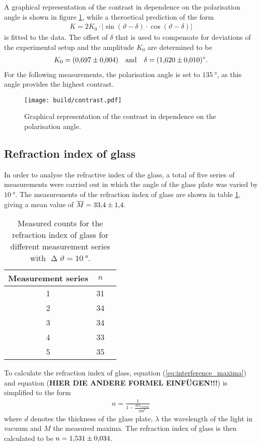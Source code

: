 \noindent
A graphical representation of the contrast in dependence on the polarisation angle is shown in figure \ref{fig:contrast}, while a theroetical prediction of the form
\begin{align}
    K = 2K_0\cdot|\sin(\vartheta-\delta)\cdot\cos(\vartheta-\delta)|
\end{align}
is fitted to the data.
The offset of $\delta$ that is used to compensate for deviations of the experimental setup and the amplitude $K_0$ are determined to be
\begin{align*}
    K_0=\SI{0.697\pm0.004}{} \quad \text{and} \quad \delta=\SI{1.620\pm0.010}{\degree}.
\end{align*}
For the following measurements, the polarisation angle is set to $\SI{135}{\degree}$, as this angle provides the highest contrast.
\begin{figure}[H]
    \centering
    \texttt{[image: build/contrast.pdf]}
    \caption{Graphical representation of the contrast in dependence on the polarisation angle.}
    \label{fig:contrast}
\end{figure}

\subsection{Refraction index of glass}
\label{subsec:refraction_glass}

In order to analyse the refractive index of the glass, a total of five series of measurements were carried out in which the angle of the glass plate was varied by $\SI{10}{\degree}$.
The measurements of the refraction index of glass are shown in table \ref{tab:refraction_glass}, giving a mean value of $\overline M=\num{33.4\pm1.4}$.
\begin{table}[H]
    \centering
    \begin{tabular}{c c c}
        \toprule
        Measurement series & $n$ \\
        \midrule
        1 & 31 \\
        2 & 34 \\
        3 & 34 \\
        4 & 33 \\
        5 & 35 \\
        \bottomrule
    \end{tabular}
    \caption{Measured counts for the refraction index of glass for different measurement series with $\upDelta \vartheta=\SI{10}{\degree}$.}
    \label{tab:refraction_glass}
\end{table}
\noindent
To calculate the refraction index of glass, equation (\ref{eq:interference_maxima}) and equation (\textbf{HIER DIE ANDERE FORMEL EINFÜGEN!!!}) is simplified to the form
\begin{align}
    n = \frac{1}{1-\frac{M\lambda_{\text{vacuum}}}{2d\theta^2}}
\end{align}
where $d$ denotes the thickness of the glass plate, $\lambda$ the wavelength of the light in vacuum and $M$ the measured maxima.
The refraction index of glass is then calculated to be $n=\num{1.531 \pm 0.034}$.


